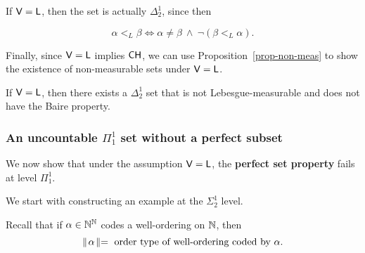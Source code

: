 If $\mathsf{V=L}$, then the set is actually $\Delta^1_2$, since then

\begin{equation}
\alpha <_L \beta \iff \alpha \neq \beta \: \wedge \: \neg(\beta <_L \alpha).
\end{equation}

Finally, since $\mathsf{V=L}$ implies $\mathsf{CH}$, we can use Proposition~\ref{prop-non-meas} to show the existence of non-measurable sets under $\mathsf{V=L}$.

\begin{corollary}\label{cor-l-reals}If $\mathsf{V=L}$, then there exists a $\Delta^1_2$ set that is not Lebesgue-measurable and does not have the Baire property.

\end{corollary}\subsubsection{An uncountable $\Pi^1_1$ set without a perfect subset}

We now show that under the assumption $\mathsf{V=L}$, the \textbf{perfect set property} fails at level $\Pi^1_1$.

We start with constructing an example at the $\Sigma^1_2$ level.

Recall that if $\alpha \in \mathbb{N}^{\mathbb{N}}$ codes a well-ordering on $\mathbb{N}$, then
\begin{equation*}
\parallel \! \alpha \!\parallel = \text{ order type of well-ordering coded by $\alpha$}.
\end{equation*}

